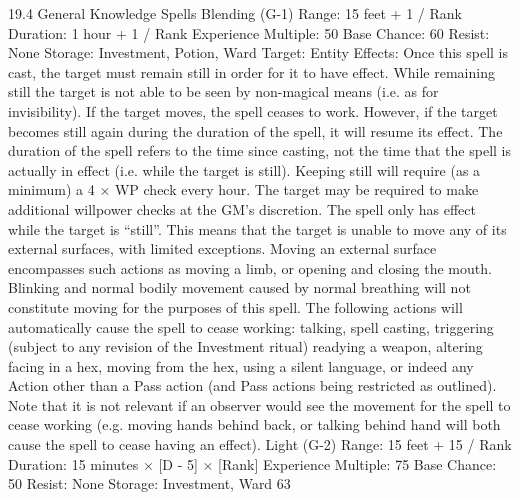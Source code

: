 \documentclass[a4paper]{article}
\begin{document}
\begin{multicols}{3}
19.4 General Knowledge Spells
Blending (G-1)
Range: 15 feet + 1 / Rank
Duration: 1 hour + 1 / Rank
Experience Multiple: 50
Base Chance: 60%
Resist: None
Storage: Investment, Potion, Ward
Target: Entity
Effects: Once this spell is cast, the target must
remain still in order for it to have effect. While
remaining still the target is not able to be seen by
non-magical means (i.e. as for invisibility). If the
target moves, the spell ceases to work. However, if
the target becomes still again during the duration of
the spell, it will resume its effect. The duration of
the spell refers to the time since casting, not the
time that the spell is actually in effect (i.e. while
the target is still).
Keeping still will require (as a minimum) a 4 × WP
check every hour. The target may be required to
make additional willpower checks at the GM’s
discretion.
The spell only has effect while the target is “still”.
This means that the target is unable to move any of
its external surfaces, with limited exceptions. Moving an external surface encompasses such actions
as moving a limb, or opening and closing the
mouth. Blinking and normal bodily movement
caused by normal breathing will not constitute
moving for the purposes of this spell. The following actions will automatically cause the spell to
cease working: talking, spell casting, triggering
(subject to any revision of the Investment ritual)
readying a weapon, altering facing in a hex, moving from the hex, using a silent language, or indeed
any Action other than a Pass action (and Pass actions being restricted as outlined). Note that it is
not relevant if an observer would see the movement for the spell to cease working (e.g. moving
hands behind back, or talking behind hand will
both cause the spell to cease having an effect).
Light (G-2)
Range: 15 feet + 15 / Rank
Duration: 15 minutes × [D - 5] × [Rank]
Experience Multiple: 75
Base Chance: 50%
Resist: None
Storage: Investment, Ward
63


\end{multicols}
\end{document}
